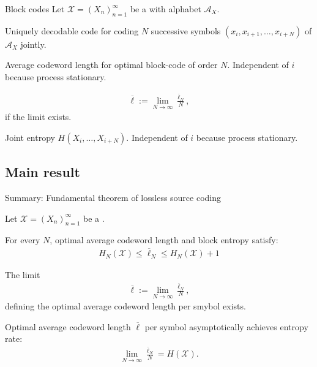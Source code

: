 \begin{frame}{Block codes}
Let $\mathcal{X}=(X_n)_{n=1}^\infty$ be a  with alphabet $\mathcal{A}_X$.  
\bit
\item {} Uniquely decodable code for coding $N$ successive symbols $(x_i,x_{i+1},\dots,x_{i+N})$ of $\mathcal{A}_X$ jointly. 
\eit
\bit
\item {} Average codeword length for optimal block-code of order $N$. Independent of $i$ because 
process stationary. 
\eit
\bit
\item {}
\begin{align*}
\overline{\ell}:=\lim_{N\to\infty}\frac{\overline{\ell}_N}{N},
\end{align*} 
if the limit exists. 
\eit
\bit
\item {} Joint entropy $H(X_{i},\dots,X_{i+N})$. Independent of $i$ because process stationary. 
\eit
\end{frame}

\subsection{Main result}
\begin{frame}{Summary: Fundamental theorem of lossless source coding}
\begin{theorem}
Let $\mathcal{X}=(X_n)_{n=1}^\infty$ be a . 
\bit
\item For every $N$, optimal average codeword length and block entropy satisfy:
\begin{align*}
H_N(\mathcal{X})\leq\overline{\ell}_N\leq H_N(\mathcal{X})+1
\end{align*}
\item The limit 
\begin{align*}
\overline{\ell}:=\lim_{N\to\infty}\frac{\overline{\ell}_N}{N},
\end{align*} 
defining the optimal average codeword length per smybol exists. 
\item Optimal average codeword length $\overline{\ell}$ per symbol asymptotically achieves entropy rate:
\begin{align*}
\lim_{N\to\infty}\frac{\overline{\ell}_N}{N}=H(\mathcal{X}).
\end{align*}
\eit
\end{theorem}

\end{frame}




